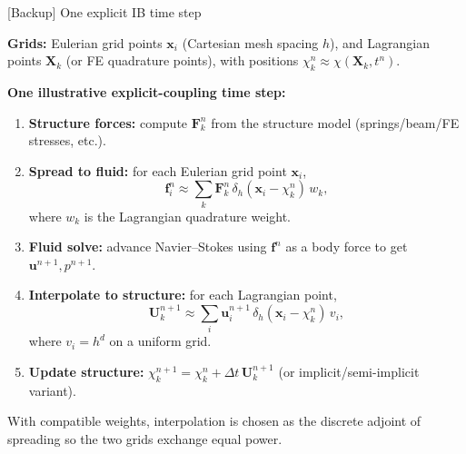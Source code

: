 \documentclass[aspectratio=169,11pt]{beamer}
\begin{document}
\begin{frame}{[Backup] One explicit IB time step}
\footnotesize
\setlength{\abovedisplayskip}{3pt}\setlength{\belowdisplayskip}{3pt}%

\textbf{Grids:}
Eulerian grid points $\mathbf{x}_{i}$ (Cartesian mesh spacing $h$), and Lagrangian points $\mathbf{X}_k$
(or FE quadrature points), with positions $\chi_k^n\approx \chi(\mathbf{X}_k,t^n)$.

\medskip
\textbf{One illustrative explicit-coupling time step:}
\begin{enumerate}\itemsep2pt
\item \textbf{Structure forces:} compute $\mathbf{F}_k^n$ from the structure model (springs/beam/FE stresses, etc.).
\item \textbf{Spread to fluid:} for each Eulerian grid point $\mathbf{x}_i$,
\[
\mathbf{f}_i^n \approx \sum_k \mathbf{F}_k^n\,\delta_h(\mathbf{x}_i-\chi_k^n)\,w_k,
\]
where $w_k$ is the Lagrangian quadrature weight.
\item \textbf{Fluid solve:} advance Navier--Stokes using $\mathbf{f}^n$ as a body force to get $\mathbf{u}^{n+1},p^{n+1}$.
\item \textbf{Interpolate to structure:} for each Lagrangian point,
\[
\mathbf U_k^{n+1} \approx \sum_i \mathbf{u}_i^{n+1}\,\delta_h(\mathbf{x}_i-\chi_k^{n})\,v_i,
\]
where $v_i=h^d$ on a uniform grid.
\item \textbf{Update structure:} $\chi_k^{n+1}=\chi_k^{n}+\Delta t\,\mathbf U_k^{n+1}$ (or implicit/semi-implicit variant).
\end{enumerate}
\smallskip
With compatible weights, interpolation is chosen as the discrete adjoint of spreading so the two grids exchange equal power.

\end{frame}
\end{document}
